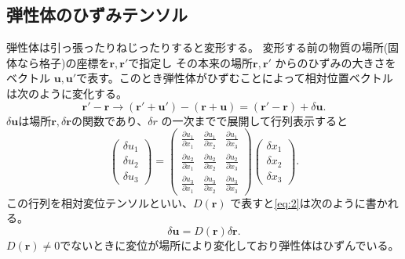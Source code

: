 \documentclass[dvipdfmx,11pt]{jsreport}
\numberwithin{equation}{chapter}
\numberwithin{table}{chapter}
\begin{document}
\subsection{弾性体のひずみテンソル}
弾性体は引っ張ったりねじったりすると変形する。
変形する前の物質の場所(固体なら格子)の座標を$\bm{r},\bm{r}'$で指定し
その本来の場所$\bm{r},\bm{r}'$ からのひずみの大きさをベクトル
$ \bm{u},\bm{u}'$で表す。このとき弾性体がひずむことによって相対位置ベクトルは次のように変化する。
\begin{equation}
\label{eq:1}
\bm{r}'-\bm{r} \to (\bm{r}'+\bm{u}')-(\bm{r}+\bm{u})=(\bm{r}'-\bm{r})+\delta \bm{u}
.\end{equation}
$\delta \bm{u}$は場所$\bm{r},\delta \bm{r}$の関数であり、$\delta r$ の一次までで展開して行列表示すると
\begin{equation}
\label{eq:2}
\begin{pmatrix} \delta u_1\\\delta u_2\\\delta u_3 \end{pmatrix} =
\begin{pmatrix} 
\frac{\partial u_1}{\partial x_1 }&\frac{\partial u_1}{\partial x_2 }&\frac{\partial u_1}{\partial x_3} \\ \frac{\partial u_2}{\partial x_1}&\frac{\partial u_2}{\partial x_2}&\frac{\partial u_2}{\partial x_3 }\\ \frac{\partial u_3}{\partial x_1} & \frac{\partial u_3}{\partial x_2} &\frac{\partial u_3}{\partial x_3} \end{pmatrix} 
\begin{pmatrix} \delta x_1\\\delta x_2 \\ \delta x_3 \end{pmatrix} 
.\end{equation}
この行列を相対変位テンソルといい、$D(\bm{r})$ で表すと\eqref{eq:2}は次のように書かれる。
\begin{equation}
\label{eq:3}
	\delta \bm{u} = D(\bm{r}) \delta \bm{r}
.\end{equation}
$D(\bm{r})\neq 0$でないときに変位が場所により変化しており弾性体はひずんでいる。
\end{document}
